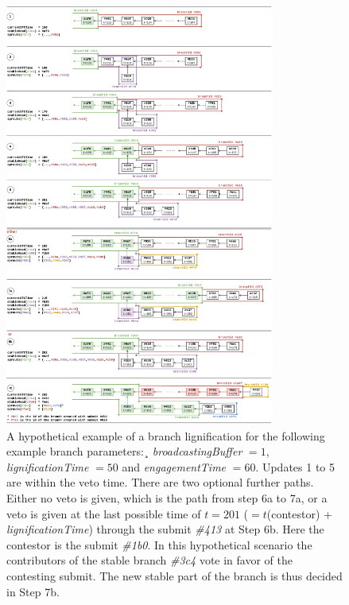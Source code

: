 \documentclass[14pt]{article}
\begin{document}
\begin{figure}[h!]
  \begin{center}
    \includegraphics[width=0.79\textwidth]{img/LignificationProcessV5.png}
\end{center}
 \caption{A hypothetical example of a branch lignification for the following example branch parameters:¸ \textit{broadcastingBuffer} $=1$, \textit{lignificationTime} $=50$ and \textit{engagementTime} $=60$. Updates 1 to 5 are within the veto time. There are two optional further paths. Either no veto is given, which is the path from step 6a to 7a, or a veto is given at the last possible time of $t=201$ ($=t$(contestor) + \textit{lignificationTime}) through the submit \textit{\#413} at Step 6b. Here the contestor is the submit \textit{\#1b0}. In this hypothetical scenario the contributors of the stable branch \textit{\#3c4} vote in favor of the contesting submit. The new stable part of the branch is thus decided in Step 7b.}
 \label{fig:bufferbranches}
\end{figure}


\end{document}
